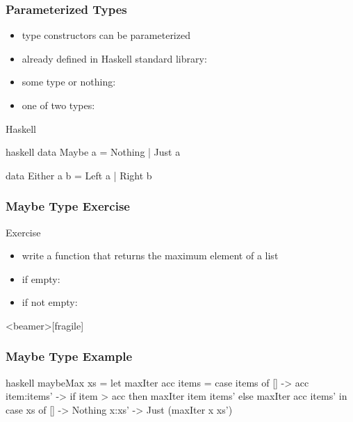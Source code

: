 \documentclass[dvipsnames]{beamer}
\theoremstyle{plain}
\begin{document}
\begin{frame}[fragile]
  \frametitle{Parameterized Types}

  \begin{itemize}
    \item type constructors can be parameterized

    \pause
    \bigskip
    \item already defined in Haskell standard library:
    \item some type or nothing: 
    \item one of two types: 
  \end{itemize}

  \begin{block}{Haskell}
    \begin{pygments}{haskell}
data Maybe a = Nothing | Just a

data Either a b = Left a | Right b
    \end{pygments}
  \end{block}
\end{frame}

\begin{frame}
  \frametitle{Maybe Type Exercise}

  \begin{block}{Exercise}
    \begin{itemize}
      \item write a function that returns the maximum element of a list
      \item if empty: 
      \item if not empty: 
    \end{itemize}
  \end{block}
\end{frame}

\begin{frame}<beamer>[fragile]
  \frametitle{Maybe Type Example}

  \begin{example}
    \begin{pygments}{haskell}
maybeMax xs =
    let
       maxIter acc items =
           case items of
             [] -> acc
             item:items' -> if item > acc
                            then maxIter item items'
                            else maxIter acc items'
    in
        case xs of
          [] -> Nothing
          x:xs' -> Just (maxIter x xs')
    \end{pygments}
  \end{example}
\end{frame}
\end{document}
